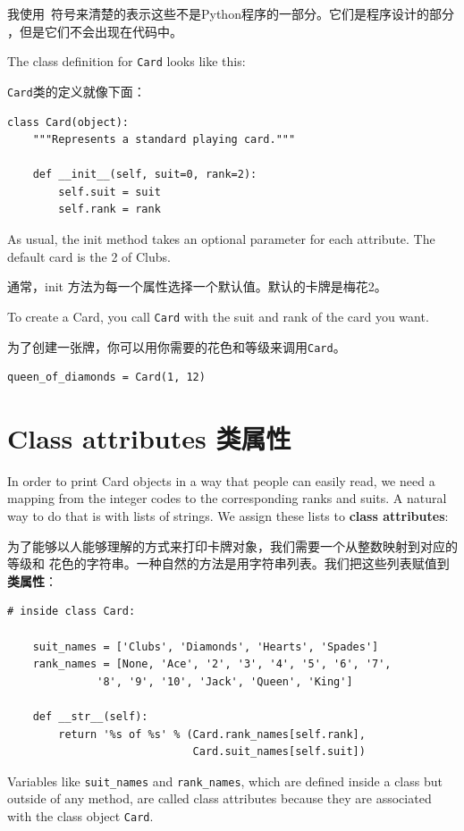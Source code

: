 \documentclass[10pt]{book}
\begin{document}
\begin{CJK}{UTF8}{gbsn}
我使用\mymapsto~符号来清楚的表示这些不是Python程序的一部分。它们是程序设计的部分
，但是它们不会出现在代码中。

The class definition for {\tt Card} looks like this:

{\tt Card}类的定义就像下面：

\begin{verbatim}
class Card(object):
    """Represents a standard playing card."""

    def __init__(self, suit=0, rank=2):
        self.suit = suit
        self.rank = rank
\end{verbatim}
%
As usual, the init method takes an optional
parameter for each attribute.  The default card is
the 2 of Clubs.

通常，init 方法为每一个属性选择一个默认值。默认的卡牌是梅花2。

To create a Card, you call {\tt Card} with the
suit and rank of the card you want.

为了创建一张牌，你可以用你需要的花色和等级来调用{\tt Card}。

\begin{verbatim}
queen_of_diamonds = Card(1, 12)
\end{verbatim}
%


\section{Class attributes 类属性}
\label{class.attribute}

In order to print Card objects in a way that people can easily
read, we need a mapping from the integer codes to the corresponding
ranks and suits.  A natural way to
do that is with lists of strings.  We assign these lists to {\bf class
attributes}:

为了能够以人能够理解的方式来打印卡牌对象，我们需要一个从整数映射到对应的等级和
花色的字符串。一种自然的方法是用字符串列表。我们把这些列表赋值到{\bf 类属性}：

\begin{verbatim}
# inside class Card:

    suit_names = ['Clubs', 'Diamonds', 'Hearts', 'Spades']
    rank_names = [None, 'Ace', '2', '3', '4', '5', '6', '7', 
              '8', '9', '10', 'Jack', 'Queen', 'King']

    def __str__(self):
        return '%s of %s' % (Card.rank_names[self.rank],
                             Card.suit_names[self.suit])
\end{verbatim}
%
Variables like \verb"suit_names" and \verb"rank_names", which are
defined inside a class but outside of any method, are called
class attributes because they are associated with the class object 
{\tt Card}.


\end{CJK}
\end{document}
